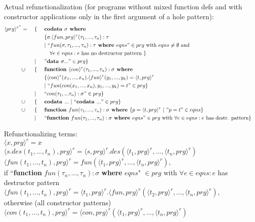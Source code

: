 \documentclass[11pt]{article} %
\begin{document}
Actual refunctionalization (for programs without mixed function defs and with constructor applications only in the first argument of a hole pattern):
\begin{alignat*}{3}
\langle prg \rangle^{r''} & = ~&& \{ ~&& \textrm{\textbf{codata }} \sigma \textrm{\textbf{ where }} \\
& && && \{ \sigma .\langle fun, prg \rangle^r (\tau_1, ..., \tau_n): \tau \\
& && && | ~ `` fun (\sigma, \tau_1, ..., \tau_n): \tau \textrm{\textbf{ where }} eqns " \in prg \textrm{ with } eqns \neq \emptyset \textrm{ and } \\
& && &&\quad \forall e \in eqns: e \textrm{ has no destructor pattern }  \} \\
& && | && "\textrm{\textbf{data }} \sigma ..." \in prg \} \\
& \cup && \{ && \textrm{\textbf{function }} \langle con \rangle^r (\tau_1, ..., \tau_n): \sigma \textrm{\textbf{ where }} \\
& && && \{ \langle con \rangle^r (x_1, ..., x_n) .\langle fun \rangle^r (y_1, ..., y_k) = \langle t, prg \rangle^r \\
& && && | ~ `` fun(con(x_1, ..., x_n), y_1, ..., y_k) = t " \in prg \} \\
& && | && `` con(\tau_1, ... \tau_n): \sigma " \in prg \} \\
& \cup && \{ && \textrm{\textbf{codata }} ... ~ | ~ `` \textrm{\textbf{codata }} ... " \in prg \} \\
& \cup && \{ && \textrm{\textbf{function }} fun(\tau_1, ..., \tau_n): \sigma \textrm{\textbf{ where }} \{ p = \langle t, prg \rangle^r ~ | ~ "p = t" \in eqns \} \\
& && | && `` \textrm{\textbf{function }} fun(\tau_1, ..., \tau_n): \sigma \textrm{\textbf{ where }} eqns " \in prg \textrm{ with } \forall e \in eqns: e \textrm{ has destr. pattern}\} 
\end{alignat*}

Refunctionalizing terms: \\
$\langle x, prg \rangle^r = x$ \\
$\langle s.des(t_1, ..., t_n), prg \rangle^r = \langle s, prg \rangle^r .des(\langle t_1, prg \rangle^r, ..., \langle t_n, prg \rangle^r)$ \\
$\langle fun(t_1, ..., t_n), prg \rangle^r = fun(\langle t_1, prg \rangle^r, ..., \langle t_n, prg \rangle^r)$, \\
if ``\textbf{function} $fun(\tau_n, ..., \tau_n): \sigma$ \textbf{where} $eqns$" $\in prg$  with $\forall e \in eqns: e$ has destructor pattern  \\
$\langle fun(t_1, ..., t_n), prg \rangle^r = \langle t_1, prg \rangle^r .\langle fun, prg \rangle^r (\langle t_2, prg \rangle^r, ..., \langle t_n, prg \rangle^r)$, \\
otherwise (all constructor patterns) \\
$\langle con(t_1, ..., t_n), prg \rangle^r = \langle con, prg \rangle^r (\langle t_1, prg \rangle^r, ..., \langle t_n, prg \rangle^r)$ \\
\end{document}
